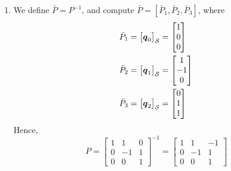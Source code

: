 \documentclass[letterpaper]{article}
\begin{document}
\begin{enumerate}
\item We define $\bar{P}=P^{-1}$, and compute $\bar{P}=[\bar{P}_1,\bar{P}_2,\bar{P}_3]$, where
$$\begin{aligned}
    \bar{P}_1 &= \big[\boldsymbol{q}_0\big]_{\cal S} = \begin{bmatrix} 1 \\ 0 \\ 0 \end{bmatrix} \\
    \bar{P}_2 &= \big[\boldsymbol{q}_1\big]_{\cal S} = \begin{bmatrix} 1 \\ -1 \\ 0 \end{bmatrix} \\
    \bar{P}_3 &= \big[\boldsymbol{q}_2\big]_{\cal S} = \begin{bmatrix} 0 \\ 1 \\ 1 \end{bmatrix} \\
\end{aligned}$$
Hence,
$$P=\begin{bmatrix} 1 & 1 & 0 \\ 0 & -1 & 1 \\ 0 & 0 & 1\end{bmatrix}^{-1} =  \begin{bmatrix} 1 & 1 & -1 \\ 0 & -1 & 1 \\ 0 & 0 & 1\end{bmatrix}$$
\end{enumerate}

\bigskip
\end{document}

